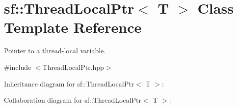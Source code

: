 \hypertarget{classsf_1_1_thread_local_ptr}{}\section{sf\+:\+:Thread\+Local\+Ptr$<$ T $>$ Class Template Reference}
\label{classsf_1_1_thread_local_ptr}


Pointer to a thread-\/local variable.  




{\ttfamily \#include $<$Thread\+Local\+Ptr.\+hpp$>$}



Inheritance diagram for sf\+:\+:Thread\+Local\+Ptr$<$ T $>$\+:


Collaboration diagram for sf\+:\+:Thread\+Local\+Ptr$<$ T $>$\+:
